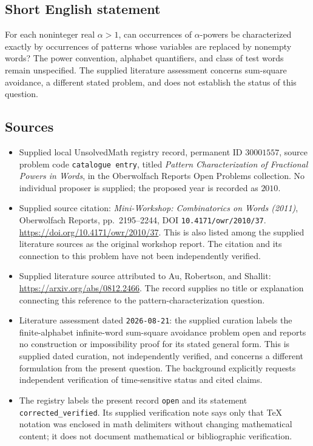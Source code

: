 \documentclass[11pt]{article}
\begin{document}
\subsection{Short English statement}
For each noninteger real \(\alpha>1\), can occurrences of \(\alpha\)-powers be characterized exactly by occurrences of patterns whose variables are replaced by nonempty words? The power convention, alphabet quantifiers, and class of test words remain unspecified. The supplied literature assessment concerns sum-square avoidance, a different stated problem, and does not establish the status of this question.
\subsection{Sources}
\begin{itemize}
\item Supplied local UnsolvedMath registry record, permanent ID \(30001557\), source problem code \texttt{catalogue entry}, titled \emph{Pattern Characterization of Fractional Powers in Words}, in the Oberwolfach Reports Open Problems collection. No individual proposer is supplied; the proposed year is recorded as \(2010\).
\item Supplied source citation: \emph{Mini-Workshop: Combinatorics on Words (2011)}, Oberwolfach Reports, pp.~2195--2244, DOI \texttt{10.4171/owr/2010/37}. \url{https://doi.org/10.4171/owr/2010/37}. This is also listed among the supplied literature sources as the original workshop report. The citation and its connection to this problem have not been independently verified.
\item Supplied literature source attributed to Au, Robertson, and Shallit: \url{https://arxiv.org/abs/0812.2466}. The record supplies no title or explanation connecting this reference to the pattern-characterization question.
\item Literature assessment dated \texttt{2026-08-21}: the supplied curation labels the finite-alphabet infinite-word sum-square avoidance problem open and reports no construction or impossibility proof for its stated general form. This is supplied dated curation, not independently verified, and concerns a different formulation from the present question. The background explicitly requests independent verification of time-sensitive status and cited claims.
\item The registry labels the present record \texttt{open} and its statement \texttt{corrected\_verified}. Its supplied verification note says only that TeX notation was enclosed in math delimiters without changing mathematical content; it does not document mathematical or bibliographic verification.
\end{itemize}
\end{document}

